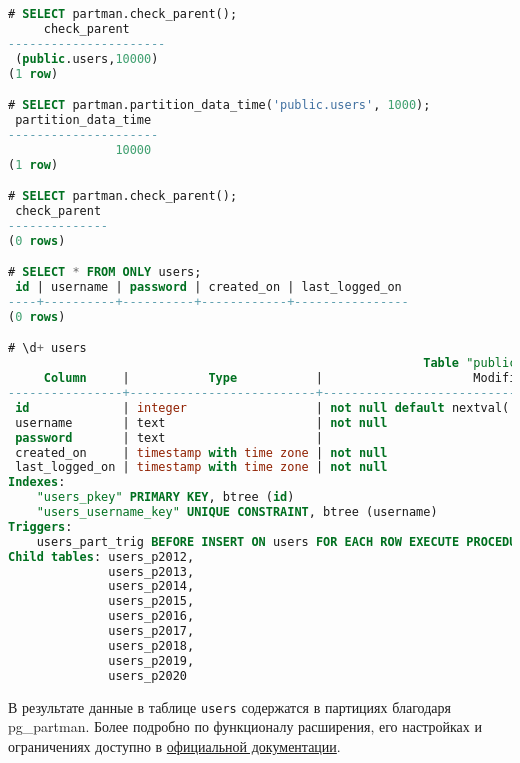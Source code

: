 \begin{lstlisting}[language=SQL,label=lst:pgpartman7,caption=Перенос данных в партиции]
# SELECT partman.check_parent();
     check_parent
----------------------
 (public.users,10000)
(1 row)

# SELECT partman.partition_data_time('public.users', 1000);
 partition_data_time
---------------------
               10000
(1 row)

# SELECT partman.check_parent();
 check_parent
--------------
(0 rows)

# SELECT * FROM ONLY users;
 id | username | password | created_on | last_logged_on
----+----------+----------+------------+----------------
(0 rows)

# \d+ users
                                                          Table "public.users"
     Column     |           Type           |                     Modifiers                      | Storage  | Stats target | Description
----------------+--------------------------+----------------------------------------------------+----------+--------------+-------------
 id             | integer                  | not null default nextval('users_id_seq'::regclass) | plain    |              |
 username       | text                     | not null                                           | extended |              |
 password       | text                     |                                                    | extended |              |
 created_on     | timestamp with time zone | not null                                           | plain    |              |
 last_logged_on | timestamp with time zone | not null                                           | plain    |              |
Indexes:
    "users_pkey" PRIMARY KEY, btree (id)
    "users_username_key" UNIQUE CONSTRAINT, btree (username)
Triggers:
    users_part_trig BEFORE INSERT ON users FOR EACH ROW EXECUTE PROCEDURE users_part_trig_func()
Child tables: users_p2012,
              users_p2013,
              users_p2014,
              users_p2015,
              users_p2016,
              users_p2017,
              users_p2018,
              users_p2019,
              users_p2020
\end{lstlisting}


В результате данные в таблице \lstinline!users! содержатся в партициях благодаря pg\_partman. Более подробно по функционалу расширения, его настройках и ограничениях доступно в  \href{https://github.com/keithf4/pg\_partman/blob/master/doc/pg\_partman.md}{официальной документации}.


